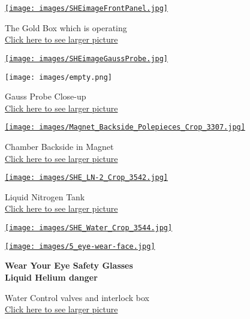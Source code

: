 \documentclass{../lab}
\begin{document}
\begin{figure}[H]
\captionsetup{justification=centering}
  \href{http://experimentationlab.berkeley.edu/sites/default/files/images/SHEimageFrontPanel.jpg}{\texttt{[image: images/SHEimageFrontPanel.jpg]}}
  \caption{The Gold Box which is operating\\ \href{http://experimentationlab.berkeley.edu/sites/default/files/images/SHEimageFrontPanel.jpg}{Click here to see larger picture}}
  \label{fig:GoldBox.jpg}
\endminipage\hfill
{}
  \href{http://experimentationlab.berkeley.edu/sites/default/files/images/SHEimageGaussProbe.jpg}{\texttt{[image: images/SHEimageGaussProbe.jpg]}}
  \caption{Gauss Probe Close-up\\ \href{http://experimentationlab.berkeley.edu/sites/default/files/images/SHEimageGaussProbe.jpg}{Click here to see larger picture}}\label{fig:GaussProbe.jpg}
\endminipage\hfill
{}
  \texttt{[image: images/empty.png]}
\endminipage
\end{figure}

\begin{figure}[H]
\captionsetup{justification=centering}
  \href{http://experimentationlab.berkeley.edu/sites/default/files/images/Magnet_Backside_Polepieces_Crop_3307.jpg}{\texttt{[image: images/Magnet\_Backside\_Polepieces\_Crop\_3307.jpg]}}
  \caption{Chamber Backside in Magnet \\ \href{http://experimentationlab.berkeley.edu/sites/default/files/images/Magnet_Backside_Polepieces_Crop_3307.jpg}{Click here to see larger picture}}
  \label{fig:Magnet_Backside_Polepieces_Crop_3307.jpg}
\endminipage\hfill
{}
  \href{http://experimentationlab.berkeley.edu/sites/default/files/images/SHE_LN-2_Crop_3542.jpg}{\texttt{[image: images/SHE\_LN-2\_Crop\_3542.jpg]}}
  \caption{Liquid Nitrogen Tank \\
  \href{http://experimentationlab.berkeley.edu/sites/default/files/images/SHE_LN-2_Crop_3542.jpg.jpg}{Click here to see larger picture}}
  \label{fig:SHE_LN-2_Crop_3542.jpg}
\endminipage\hfill
{}
  \href{http://experimentationlab.berkeley.edu/sites/default/files/images/SHE_Water_Crop_3544.jpg}{\texttt{[image: images/SHE\_Water\_Crop\_3544.jpg]}}
  \caption{Water Control valves and interlock box \\ \href{http://experimentationlab.berkeley.edu/sites/default/files/images/SHE_Water_Crop_3544.jpg}{Click here to see larger picture}}\label{fig:SHE_Water_Crop_3544.jpg}
\endminipage\hfill
{}
  \href{http://experimentationlab.berkeley.edu/sites/default/files/upimages/5_eye-wear-face.jpg}{\texttt{[image: images/5\_eye-wear-face.jpg]}} 
  
  \textbf{Wear Your Eye Safety Glasses \\ Liquid Helium danger}
  \label{fig:5_eye-wear-face.jpg}
\endminipage
\end{figure}
\end{document}
